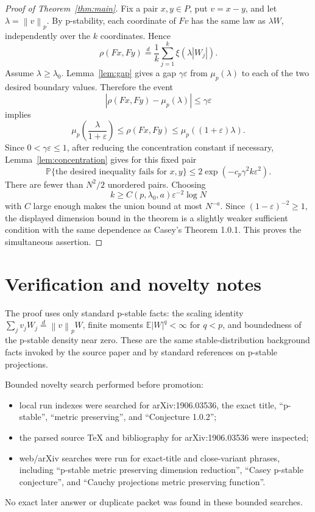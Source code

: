 \documentclass[11pt]{article}
\newcommand{\E}{\mathbb{E}}
\newcommand{\Prob}{\mathbb{P}}
\newcommand{\norm}[1]{\left\lVert #1\right\rVert}
\newcommand{\abs}[1]{\left\lvert #1\right\rvert}
\newcommand{\eps}{\varepsilon}
\begin{document}
\begin{proof}[Proof of Theorem~\ref{thm:main}]
Fix a pair \(x,y\in P\), put \(v=x-y\), and let
\(\lambda=\norm v_p\).  By p-stability, each coordinate of \(Fv\) has the same
law as \(\lambda W\), independently over the \(k\) coordinates.  Hence
\[
  \rho(Fx,Fy)
  \stackrel{d}{=}
  \frac1k\sum_{j=1}^k \xi(\lambda\abs{W_j}).
\]
Assume \(\lambda\geq\lambda_0\).  Lemma~\ref{lem:gap} gives a gap
\(\gamma\eps\) from \(\mu_p(\lambda)\) to each of the two desired boundary
values.  Therefore the event
\[
 \left|\rho(Fx,Fy)-\mu_p(\lambda)\right|\leq\gamma\eps
\]
implies
\[
\mu_p\left(\frac{\lambda}{1+\eps}\right)
\leq \rho(Fx,Fy)
\leq \mu_p((1+\eps)\lambda).
\]
Since \(0<\gamma\eps\leq1\), after reducing the concentration constant if
necessary, Lemma~\ref{lem:concentration} gives for this fixed pair
\[
\Prob\{\text{the desired inequality fails for }x,y\}
\leq 2\exp(-c_p\gamma^2 k\eps^2).
\]
There are fewer than \(N^2/2\) unordered pairs.  Choosing
\[
  k\geq C(p,\lambda_0,a)\eps^{-2}\log N
\]
with \(C\) large enough makes the union bound at most \(N^{-a}\).  Since
\((1-\eps)^{-2}\geq1\), the displayed dimension bound in the theorem is a
slightly weaker sufficient condition with the same dependence as Casey's
Theorem 1.0.1.  This proves the simultaneous assertion.
\end{proof}

\section{Verification and novelty notes}

The proof uses only standard p-stable facts: the scaling identity
\(\sum_j v_j W_j\stackrel{d}{=}\norm v_p W\), finite moments
\(\E\abs W^q<\infty\) for \(q<p\), and boundedness of the p-stable density near
zero.  These are the same stable-distribution background facts invoked by the
source paper and by standard references on p-stable projections.

Bounded novelty search performed before promotion:
\begin{itemize}
\item local run indexes were searched for arXiv:1906.03536, the exact title,
  ``p-stable'', ``metric preserving'', and ``Conjecture 1.0.2'';
\item the parsed source TeX and bibliography for arXiv:1906.03536 were
  inspected;
\item web/arXiv searches were run for exact-title and close-variant phrases,
  including ``p-stable metric preserving dimension reduction'', ``Casey
  p-stable conjecture'', and ``Cauchy projections metric preserving
  function''.
\end{itemize}
No exact later answer or duplicate packet was found in these bounded searches.
\end{document}
